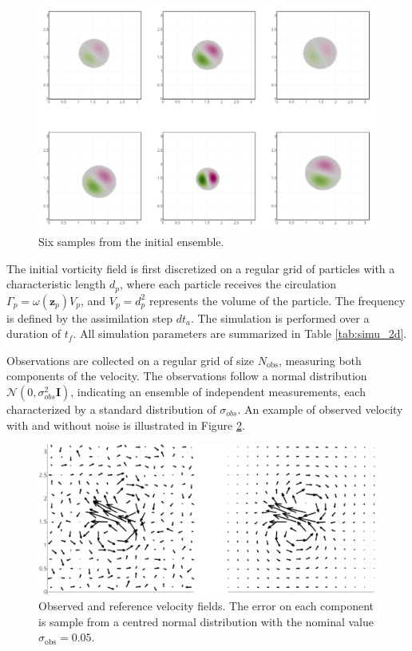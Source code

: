 \begin{figure}[ht]
	\centering
	\includegraphics[width=0.7\linewidth]{images/app2d/ensemble_sample.png}
	\caption{Six samples from the initial ensemble.}
	\label{fig:sample_ens}
\end{figure}

The initial vorticity field is first discretized on a regular grid of particles with a characteristic length $d_p$, where each particle receives the circulation $\Gamma_p = \omega(\bm z_p) V_p$, and $V_p = d_p^2$ represents the volume of the particle. The frequency is defined by the assimilation step $dt_a$. The simulation is performed over a duration of $t_f$. All simulation parameters are summarized in Table \ref{tab:simu_2d}.

Observations are collected on a regular grid of size $N_{\text{obs}}$, measuring both components of the velocity. The observations follow a normal distribution $\mathcal N(0, \sigma_{obs}^2 \bm{I})$, indicating an ensemble of independent measurements, each characterized by a standard distribution of $\sigma_{obs}$. An example of observed velocity with and without noise is illustrated in Figure \ref{fig:velocity}.

\begin{figure}[htbp]
	\centering
	\includegraphics[width=0.8\linewidth]{images/app2d/velocity_ref_recadre.pdf}
	\caption{Observed and reference velocity fields. The error on each component is sample from a centred normal distribution with the nominal value $\sigma_{\text{obs}} = 0.05$.}
	\label{fig:velocity}
\end{figure}

